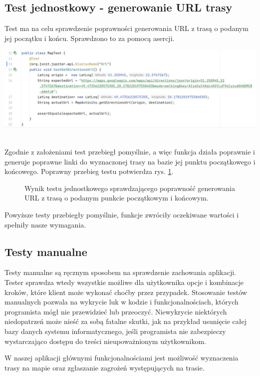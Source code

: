 \subsection*{Test jednostkowy - generowanie URL trasy}
Test ma na celu sprawdzenie poprawności generowania URL z trasą o podanym jej początku i końcu. Sprawdzono to za pomocą asercji.\\
\noindent
\begin{minipage}{\linewidth}
    \label{test:map}
    \centering
    \includegraphics[width=0.8\linewidth]{img/test/testmap.jpg}
\end{minipage}
\\
Zgodnie z założeniami test przebiegł pomyślnie, a więc funkcja działa poprawnie i generuje poprawne linki do wyznaczonej trasy na bazie jej punktu początkowego i końcowego. Poprawny przebieg testu potwierdza rys. \ref{result:map}. \\

\setlength{\fboxrule}{0.5pt}
\begin{figure}[H]
    \centering
    \caption{Wynik testu jednostkowego sprawdzającego poprawność generowania URL z trasą o podanym punkcie początkowym i końcowym.}
    \label{result:map}
\end{figure}

Powyższe testy przebiegły pomyślnie, funkcje zwróciły oczekiwane wartości i spełniły nasze wymagania.

\subsection{Testy manualne}
Testy manualne są ręcznym sposobem na sprawdzenie zachowania aplikacji. Tester sprawdza wtedy wszystkie możliwe dla użytkownika opcje i kombinacje kroków, które klient może wykonać choćby przez przypadek. Stosowanie testów manualnych pozwala na wykrycie luk w kodzie i funkcjonalnościach, których programista mógł nie przewidzieć lub przeoczyć. Niewykrycie niektórych niedopatrzeń może nieść za sobą fatalne skutki, jak na przykład usunięcie całej bazy danych systemu informatycznego, jeśli programista nie zabezpieczy wystarczająco dostępu do treści nieupoważnionym użytkownikom.\par
W naszej aplikacji głównymi funkcjonalnościami jest możliwość wyznaczenia trasy na mapie oraz zgłaszanie zagrożeń występujących na trasie.
